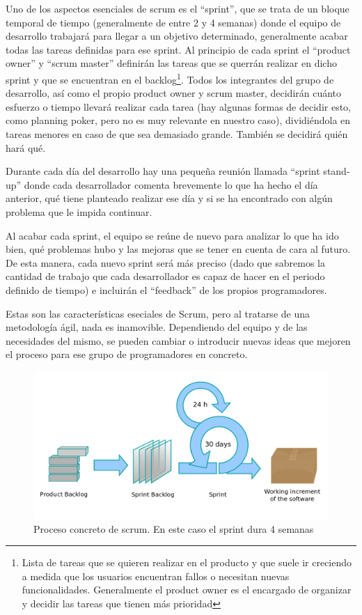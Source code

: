 Uno de los aspectos esenciales de scrum es el ``sprint'', que se trata de un bloque temporal de tiempo (generalmente de entre 2 y 4 semanas) donde el equipo de desarrollo trabajará para llegar a un objetivo determinado, generalmente acabar todas las tareas definidas para ese sprint. 
Al principio de cada sprint  el ``product owner'' y ``scrum master'' definirán las tareas que se querrán realizar en dicho sprint y que se encuentran en el backlog\footnote{Lista de tareas que se quieren realizar en el producto y que suele ir creciendo a medida que los usuarios encuentran fallos o necesitan nuevas funcionalidades. Generalmente el product owner es el encargado de organizar y decidir las tareas que tienen más prioridad}. Todos los integrantes del grupo de desarrollo, así como el propio product owner y scrum master, decidirán cuánto esfuerzo o tiempo llevará realizar cada tarea (hay algunas formas de decidir esto, como planning poker, pero no es muy relevante en nuestro caso), dividiéndola en tareas menores en caso de que sea demasiado grande. También se decidirá quién hará qué.

Durante cada día del desarrollo hay una pequeña reunión llamada ``sprint stand-up'' donde cada desarrollador comenta brevemente lo que ha hecho el día anterior, qué tiene planteado realizar ese día y si se ha encontrado con algún problema que le impida continuar.

Al acabar cada sprint, el equipo se reúne de nuevo para analizar lo que ha ido bien, qué problemas hubo y las mejoras que se tener en cuenta de cara al futuro. De esta manera, cada nuevo sprint será más preciso (dado que sabremos la cantidad de trabajo que cada desarrollador es capaz de hacer en el periodo definido de tiempo) e incluirán el ``feedback'' de los propios programadores.

Estas son las características eseciales de Scrum, pero al tratarse de una metodología ágil, nada es inamovible. Dependiendo del equipo y de las necesidades del mismo, se pueden cambiar o introducir nuevas ideas que mejoren el proceso para ese grupo de programadores en concreto.

\begin{figure}[H]
		\includegraphics[width=\textwidth,height=\textheight,keepaspectratio]{./img/scrumprocess.png}
	\caption{Proceso concreto de scrum. En este caso el sprint dura 4 semanas}
	\label{fig:scrumproceso}
\end{figure}


